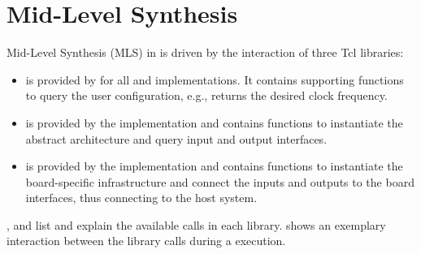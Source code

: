 \section{Mid-Level Synthesis}\label{sec:mls}%
Mid-Level Synthesis (MLS) in \tpc{} is driven by the interaction of three Tcl libraries:
%
\begin{itemize}
  \item {} is provided by \tpc{} for all  and  implementations. It contains supporting functions to query the user configuration, e.g.,  returns the desired clock frequency.
  \item {} is provided by the  implementation and contains functions to instantiate the abstract architecture and query input and output interfaces.
  \item {} is provided by the  implementation and contains functions to instantiate the board-specific infrastructure and connect the  inputs and outputs to the board interfaces, thus connecting to the host system.
\end{itemize}
%
,  and  list and explain the available calls in each library.
 shows an exemplary interaction between the library calls during a  execution.

